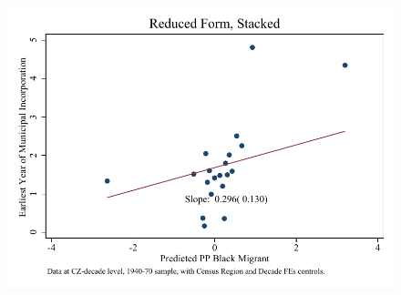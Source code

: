 \documentclass{article}
\begin{document}
\begin{figure}
\centering
\includegraphics{figures/simplefigs/stacked_cgoodman_raw_C3_full_rf.pdf}
\end{figure}
\clearpage
\end{document}
